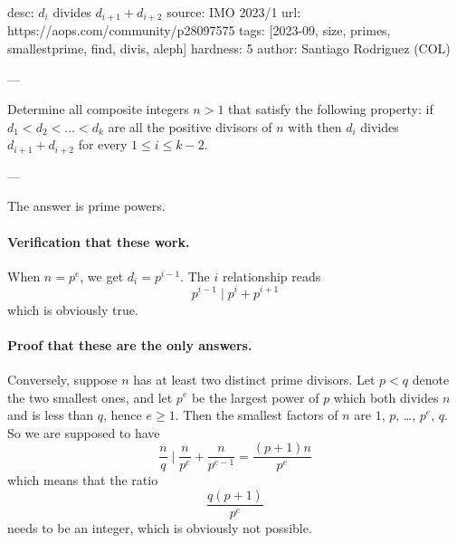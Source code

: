 desc: $d_i$ divides $d_{i+1}+d_{i+2}$
source: IMO 2023/1
url: https://aops.com/community/p28097575
tags: [2023-09, size, primes, smallestprime, find, divis, aleph]
hardness: 5
author: Santiago Rodriguez (COL)

---

Determine all composite integers $n>1$ that satisfy the following property:
if $d_1 < d_2 < \dots < d_k$ are all the positive divisors of $n$ with
then $d_i$ divides $d_{i+1} + d_{i+2}$ for every $1 \leq i \leq k - 2$.

---

The answer is prime powers.

\paragraph{Verification that these work.}
When $n = p^e$, we get $d_i = p^{i-1}$.
The $i$ relationship reads \[ p^{i-1} \mid p^i + p^{i+1} \]
which is obviously true.

\paragraph{Proof that these are the only answers.}
Conversely, suppose $n$ has at least two distinct prime divisors.
Let $p < q$ denote the two smallest ones,
and let $p^e$ be the largest power of $p$ which both divides $n$
and is less than $q$, hence $e \ge 1$.
Then the smallest factors of $n$ are $1$, $p$, \dots, $p^e$, $q$.
So we are supposed to have
\[ \frac{n}{q} \mid \frac{n}{p^e} + \frac{n}{p^{e-1}}
    = \frac{(p+1)n}{p^e} \]
which means that the ratio
\[ \frac{q(p+1)}{p^e} \]
needs to be an integer, which is obviously not possible.
